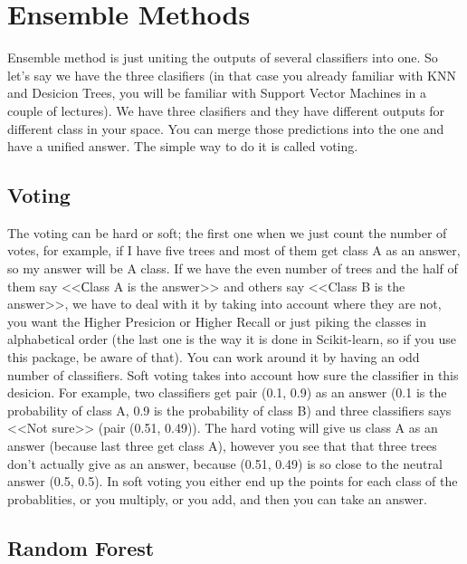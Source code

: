 \chapter{Ensemble Methods}

{\sf Ensemble method is just uniting the outputs of several classifiers into one. So let's say we have the three clasifiers (in that case you already familiar with KNN and Desicion Trees, you will be familiar with Support Vector Machines in a couple of lectures). We have three clasifiers and they have different outputs for different class in your space. You can merge those predictions into the one and have a unified answer. The simple way to do it is called voting.}

\section{Voting}

 The voting can be hard or soft; the first one when we just count the number of votes, for example, if I have five trees and most of them get class A as an answer, so my answer will be A class. If we have the even number of trees and the half of them say <<Сlass A is the answer>> and others say <<Class B is the answer>>, we have to deal with it by taking into account where they are not, you want the Higher Presicion or Higher Recall or just piking the classes in alphabetical order (the last one is the way it is done in Scikit-learn, so if you use this package, be aware of that). You can work around it by having an odd number of classifiers. Soft voting takes into account how sure the classifier in this desicion. For example, two classifiers get pair (0.1, 0.9) as an answer (0.1 is the probability of class A, 0.9 is the probability of class B) and three classifiers says <<Not sure>> (pair (0.51, 0.49)). The hard voting will give us class A as an answer (because last three get class A), however you see that that three trees don't actually give as an answer, because (0.51, 0.49) is so close to the neutral answer (0.5, 0.5). In soft voting you either end up the points for each class of the probablities, or you multiply, or you add, and then you can take an answer.

\section{Random Forest}

